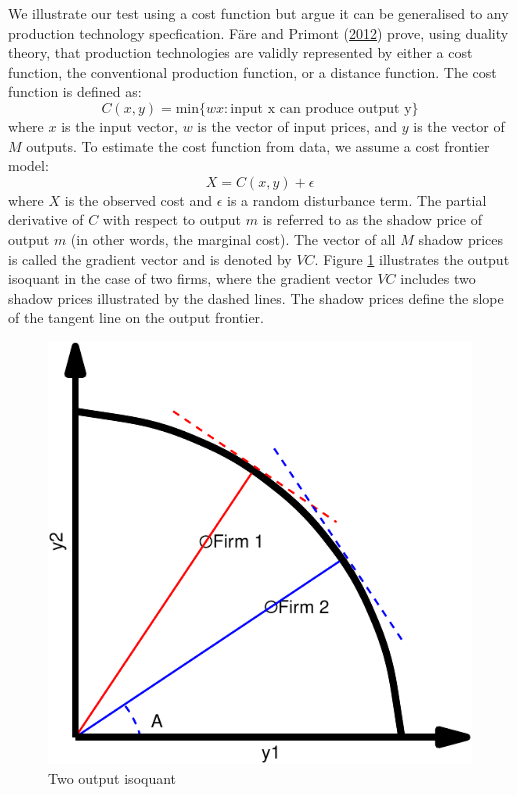 \documentclass[12pt,]{article}
\begin{document}
We illustrate our test using a cost function but argue it can be generalised to any production technology specfication. Färe and Primont (\protect\hyperlink{ref-Fare2012}{2012}) prove, using duality theory, that production technologies are validly represented by either a cost function, the conventional production function, or a distance function. The cost function is defined as:
\begin{equation}
C(x,y)=\text{min} \{wx:\text{input x can produce output y}\}
\label{eq:CostFn}
\end{equation}
where \(x\) is the input vector, \(w\) is the vector of input prices, and \(y\) is the vector of \(M\) outputs. To estimate the cost function from data, we assume a cost frontier model:
\begin{equation}
X=C(x,y) + \epsilon
\label{eq:CostFront}
\end{equation}
where \(X\) is the observed cost and \(\epsilon\) is a random disturbance term. The partial derivative of \(C\) with respect to output \(m\) is referred to as the shadow price of output \(m\) (in other words, the marginal cost). The vector of all \(M\) shadow prices is called the gradient vector and is denoted by \(VC\). Figure \ref{fig:isoquant} illustrates the output isoquant in the case of two firms, where the gradient vector \(VC\) includes two shadow prices illustrated by the dashed lines. The shadow prices define the slope of the tangent line on the output frontier.

\begin{figure}[H]

{\centering \includegraphics[width=0.7\linewidth]{lurking_co2_files/figure-latex/isoquant-1} 

}

\caption{ Two output isoquant}\label{fig:isoquant}
\end{figure}
\end{document}

